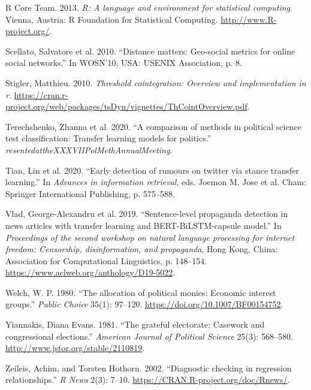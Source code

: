 \documentclass[12pt,]{article}
\begin{document}
\leavevmode\hypertarget{ref-r}{}%
R Core Team. 2013. \emph{R: A language and environment for statistical
computing}. Vienna, Austria: R Foundation for Statistical Computing.
\url{http://www.R-project.org/}.

\leavevmode\hypertarget{ref-scellato2010}{}%
Scellato, Salvatore et al. 2010. ``Distance matters: Geo-social metrics
for online social networks.'' In WOSN'10, USA: USENIX Association, p. 8.

\leavevmode\hypertarget{ref-tsdyn}{}%
Stigler, Matthieu. 2010. \emph{Threshold cointegration: Overview and
implementation in r}.
\url{https://cran.r-project.org/web/packages/tsDyn/vignettes/ThCointOverview.pdf}.

\leavevmode\hypertarget{ref-terechshenko2020}{}%
Terechshenko, Zhanna et al. 2020. ``A comparison of methods in political
science test classification: Transfer learning models for politics.''
\emph{resentedattheXXXVIIPolMethAnnualMeeting}.

\leavevmode\hypertarget{ref-tian2020}{}%
Tian, Lin et al. 2020. ``Early detection of rumours on twitter via
stance transfer learning.'' In \emph{Advances in information retrieval},
eds. Joemon M. Jose et al. Cham: Springer International Publishing, p.
575--588.

\leavevmode\hypertarget{ref-vlad2019}{}%
Vlad, George-Alexandru et al. 2019. ``Sentence-level propaganda
detection in news articles with transfer learning and
BERT-BiLSTM-capsule model.'' In \emph{Proceedings of the second workshop
on natural language processing for internet freedom: Censorship,
disinformation, and propaganda}, Hong Kong, China: Association for
Computational Linguistics, p. 148--154.
\url{https://www.aclweb.org/anthology/D19-5022}.

\leavevmode\hypertarget{ref-welch1980}{}%
Welch, W. P. 1980. ``The allocation of political monies: Economic
interest groups.'' \emph{Public Choice} 35(1): 97--120.
\url{https://doi.org/10.1007/BF00154752}.

\leavevmode\hypertarget{ref-yiannakis1981}{}%
Yiannakis, Diana Evans. 1981. ``The grateful electorate: Casework and
congressional elections.'' \emph{American Journal of Political Science}
25(3): 568--580. \url{http://www.jstor.org/stable/2110819}.

\leavevmode\hypertarget{ref-lmtest}{}%
Zeileis, Achim, and Torsten Hothorn. 2002. ``Diagnostic checking in
regression relationships.'' \emph{R News} 2(3): 7--10.
\url{https://CRAN.R-project.org/doc/Rnews/}.





\newpage
\singlespacing 
\end{document}
